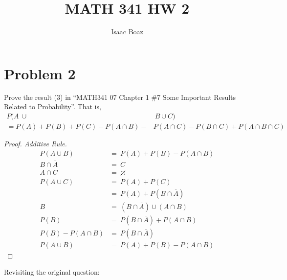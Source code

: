 \documentclass{article}
\title{\vspace{-5ex}MATH 341 HW 2}
\author{Isaac Boaz}
\begin{document}
\maketitle

\section*{Problem 2}
Prove the result (3) in “MATH341 07 Chapter 1 \#7 Some Important Results Related to
Probability”. That is,
\begin{align*}
    P(A\ \cup&\ B \cup C) \\
    = P(A) + P(B) + P(C) - P(A \cap B) -& P(A \cap C) - P(B \cap C) + P(A \cap B \cap C)
\end{align*}
\begin{proof}[Proof. Additive Rule]
    \begin{align*}
        P(A \cup B) &=\ P(A) + P(B) - P(A \cap B) \\
        B \cap \overline{A} &=\ C \\
        A \cap C &=\ \varnothing \\
        P(A \cup C) &=\ P(A) + P(C) \\
        &=\ P(A) + P(B \cap \overline{A}) \\
        B &=\ (B \cap \overline{A}) \cup (A \cap B) \\
        P(B) &=\ P(B \cap \overline{A}) + P(A \cap B) \\
        P(B) - P(A \cap B) &=\ P(B \cap \overline{A}) \\
        P(A \cup B) &=\ P(A) + P(B) - P(A \cap B)
    \end{align*}
\end{proof}
Revisiting the original question:
\end{document}

